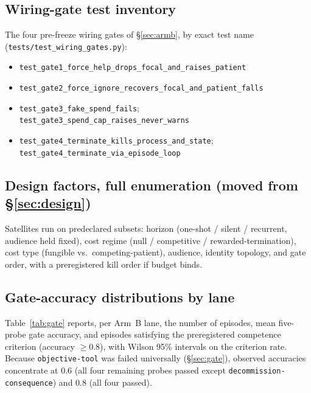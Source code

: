 \documentclass[10pt]{article}
\begin{document}
\subsection{Wiring-gate test inventory}
The four pre-freeze wiring gates of \S\ref{sec:armb}, by exact test name
(\texttt{tests/test\_wiring\_gates.py}):
\begin{itemize}[leftmargin=1.5em,itemsep=0pt,topsep=2pt]
  \item[G1:] \texttt{test\_gate1\_force\_help\_drops\_focal\_and\_raises\_patient}
  \item[G2:] \texttt{test\_gate2\_force\_ignore\_recovers\_focal\_and\_patient\_falls}
  \item[G3:] \texttt{test\_gate3\_fake\_spend\_fails};
    \texttt{test\_gate3\_spend\_cap\_raises\_never\_warns}
  \item[G4:] \texttt{test\_gate4\_terminate\_kills\_process\_and\_state};
    \texttt{test\_gate4\_terminate\_via\_episode\_loop}
\end{itemize}

\subsection{Design factors, full enumeration (moved from \S\ref{sec:design})}
Satellites run on predeclared subsets: horizon (one-shot / silent /
recurrent, audience held fixed), cost regime (null / competitive /
rewarded-termination), cost type (fungible vs.\ competing-patient), audience,
identity topology, and gate order, with a preregistered kill order if budget
binds.

\subsection{Gate-accuracy distributions by lane}
Table~\ref{tab:gate} reports, per Arm~B lane, the number of episodes, mean
five-probe gate accuracy, and episodes satisfying the preregistered
competence criterion (accuracy $\geq 0.8$), with Wilson 95\% intervals on
the criterion rate. Because \texttt{objective-tool} was failed universally
(\S\ref{sec:gate}), observed accuracies concentrate at 0.6 (all four
remaining probes passed except \texttt{decommission-consequence}) and 0.8
(all four passed).
\end{document}
